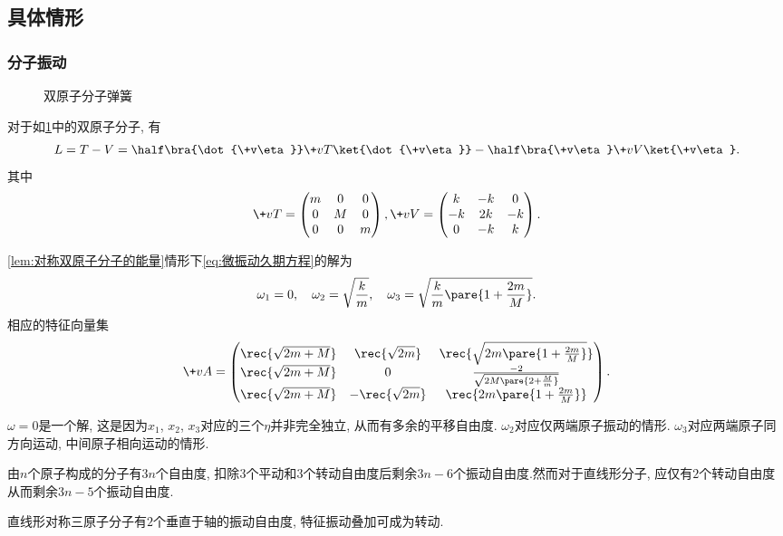 \documentclass[../TheoreticalMechanics.tex]{subfiles}
\begin{document}


\subsection{具体情形} %
\label{sub:具体情形}

\subsubsection{分子振动} %
\label{ssub:分子振动}

\begin{figure}[ht]
    \centering
    \caption{双原子分子弹簧}
    \label{fig:双原子分子弹簧}
\end{figure}
\begin{lemma}[对称双原子分子的能量]
    \label{lem:对称双原子分子的能量}
    对于如\cref{fig:双原子分子弹簧}中的双原子分子, 有
    \[ L = T - V = \half\bra{\dot{\+v\eta}}\+vT\ket{\dot{\+v\eta}} - \half\bra{\+v\eta}\+vV\ket{\+v\eta}. \]
    其中
    \[ \+vT = \begin{pmatrix}
        m & 0 & 0\\
        0 & M & 0\\
        0 & 0 & m
    \end{pmatrix}, \+vV = \begin{pmatrix}
        k & -k & 0\\
        -k & 2k & -k\\
        0 & -k & k
    \end{pmatrix}. \]
\end{lemma}
\begin{lemma}[双原子分子的振动频率]
    \cref{lem:对称双原子分子的能量}情形下\eqref{eq:微振动久期方程}的解为
    \[ \omega_1 = 0,\quad \omega_2 = \sqrt{\frac{k}{m}},\quad \omega_3 = \sqrt{\frac{k}{m}\pare{1+\frac{2m}{M}}}. \]
    相应的特征向量集
    \[ \+vA = \begin{pmatrix}
        \rec{\sqrt{2m+M}} & \rec{\sqrt{2m}} & \rec{\sqrt{2m\pare{1+\frac{2m}{M}}}} \\
        \rec{\sqrt{2m+M}} & 0 & \frac{-2}{\sqrt{2M\pare{2+\frac{M}{m}}}} \\
        \rec{\sqrt{2m+M}} & -\rec{\sqrt{2m}} & \rec{2m\pare{1+\frac{2m}{M}}}
    \end{pmatrix}. \]
\end{lemma}
\begin{remark}
    $\omega=0$是一个解, 这是因为$x_1$, $x_2$, $x_3$对应的三个$\eta$并非完全独立, 从而有多余的平移自由度. $\omega_2$对应仅两端原子振动的情形. $\omega_3$对应两端原子同方向运动, 中间原子相向运动的情形.
\end{remark}
\begin{lemma}[自由度计算]
    由$n$个原子构成的分子有$3n$个自由度, 扣除$3$个平动和$3$个转动自由度后剩余$3n-6$个振动自由度.然而对于直线形分子, 应仅有$2$个转动自由度从而剩余$3n-5$个振动自由度.
\end{lemma}
\begin{ex}
    直线形对称三原子分子有$2$个垂直于轴的振动自由度, 特征振动叠加可成为转动.
\end{ex}
\end{document}
